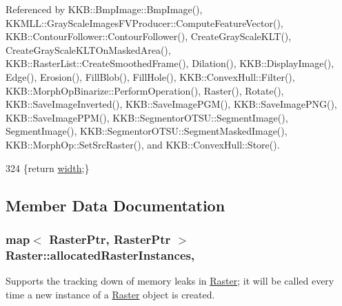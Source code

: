 Referenced by K\+K\+B\+::\+Bmp\+Image\+::\+Bmp\+Image(), K\+K\+M\+L\+L\+::\+Gray\+Scale\+Images\+F\+V\+Producer\+::\+Compute\+Feature\+Vector(), K\+K\+B\+::\+Contour\+Follower\+::\+Contour\+Follower(), Create\+Gray\+Scale\+K\+L\+T(), Create\+Gray\+Scale\+K\+L\+T\+On\+Masked\+Area(), K\+K\+B\+::\+Raster\+List\+::\+Create\+Smoothed\+Frame(), Dilation(), K\+K\+B\+::\+Display\+Image(), Edge(), Erosion(), Fill\+Blob(), Fill\+Hole(), K\+K\+B\+::\+Convex\+Hull\+::\+Filter(), K\+K\+B\+::\+Morph\+Op\+Binarize\+::\+Perform\+Operation(), Raster(), Rotate(), K\+K\+B\+::\+Save\+Image\+Inverted(), K\+K\+B\+::\+Save\+Image\+P\+G\+M(), K\+K\+B\+::\+Save\+Image\+P\+N\+G(), K\+K\+B\+::\+Save\+Image\+P\+P\+M(), K\+K\+B\+::\+Segmentor\+O\+T\+S\+U\+::\+Segment\+Image(), Segment\+Image(), K\+K\+B\+::\+Segmentor\+O\+T\+S\+U\+::\+Segment\+Masked\+Image(), K\+K\+B\+::\+Morph\+Op\+::\+Set\+Src\+Raster(), and K\+K\+B\+::\+Convex\+Hull\+::\+Store().


\begin{DoxyCode}
324 \{\textcolor{keywordflow}{return}  \hyperlink{class_k_k_b_1_1_raster_ae0bcc103e191c3421d7692dc69ceb554}{width};\}
\end{DoxyCode}


\subsection{Member Data Documentation}
\subsubsection[{\texorpdfstring{allocated\+Raster\+Instances}{allocatedRasterInstances}}]{\setlength{\rightskip}{0pt plus 5cm}map$<$ {\bf Raster\+Ptr}, {\bf Raster\+Ptr} $>$ Raster\+::allocated\+Raster\+Instances\hspace{0.3cm}{\ttfamily [static]}, {\ttfamily [protected]}}\hypertarget{class_k_k_b_1_1_raster_a58c233ff55c2a1fa1b021776e7437c27}{}\label{class_k_k_b_1_1_raster_a58c233ff55c2a1fa1b021776e7437c27}


Supports the tracking down of memory leaks in \hyperlink{class_k_k_b_1_1_raster}{Raster}; it will be called every time a new instance of a \textquotesingle{}\hyperlink{class_k_k_b_1_1_raster}{Raster}\textquotesingle{} object is created. 



